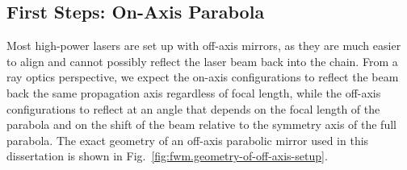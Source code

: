 \documentclass[11pt,SymmetricalJury]{inrsthesis/inrsthesis}
\begin{document}
\subsection{First Steps: On-Axis Parabola}

Most high-power lasers are set up with off-axis mirrors, as they are much
easier to align and cannot possibly reflect the laser beam back into the
chain. From a ray optics perspective, we expect the on-axis configurations
to reflect the beam back the same propagation axis regardless of focal length,
while the off-axis configurations to reflect at an angle that depends on the focal
length of the parabola and on the shift of the beam relative to the symmetry
axis of the full parabola.
The exact geometry of an off-axis parabolic mirror used in this dissertation
is shown in Fig.~\ref{fig:fwm.geometry-of-off-axis-setup}.
\end{document}
